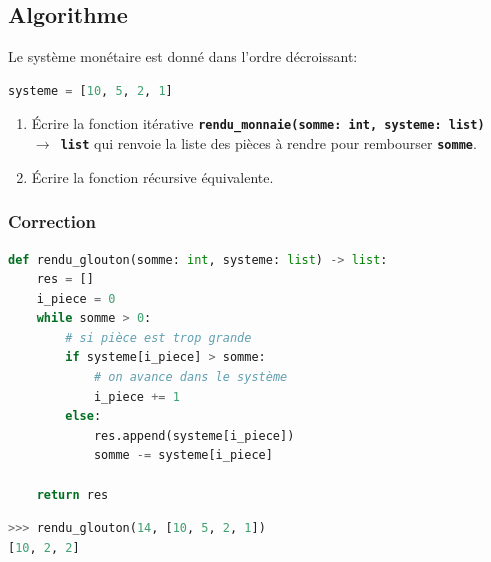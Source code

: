 \documentclass[svgnames,11pt]{beamer}
\begin{document}
\subsection{Algorithme}
\begin{frame}[fragile]
    \begin{activite}
Le système monétaire est donné dans l'ordre décroissant:
\begin{lstlisting}[language=Python , basicstyle=\ttfamily\small, xleftmargin=2em, xrightmargin=2em]
systeme = [10, 5, 2, 1]
\end{lstlisting}
\begin{enumerate}
    \item Écrire la fonction itérative \textbf{\texttt{rendu\_monnaie(somme: int, systeme: list) $\rightarrow$ list}} qui renvoie la liste des pièces à rendre pour rembourser \textbf{\texttt{somme}}.
    \item Écrire la fonction récursive équivalente.
\end{enumerate}
    \end{activite}
\end{frame}
\begin{frame}[fragile]
    \frametitle{Correction}
\begin{center}
\begin{lstlisting}[language=Python , basicstyle=\ttfamily\small, xleftmargin=0.2em, xrightmargin=-1em]
def rendu_glouton(somme: int, systeme: list) -> list:
    res = []
    i_piece = 0
    while somme > 0:
        # si pièce est trop grande
        if systeme[i_piece] > somme:
            # on avance dans le système
            i_piece += 1
        else:
            res.append(systeme[i_piece])
            somme -= systeme[i_piece]

    return res
\end{lstlisting}
\begin{lstlisting}[language=Python , basicstyle=\ttfamily\small, xleftmargin=0.2em, xrightmargin=0em]
>>> rendu_glouton(14, [10, 5, 2, 1])
[10, 2, 2]
\end{lstlisting}
\end{center}

\end{frame}
\end{document}
